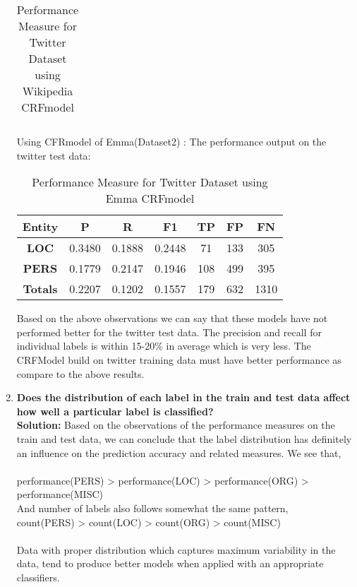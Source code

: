 \documentclass[12pt]{article}
\begin{document}
\begin{enumerate}
\begin{table}[ht!]
\begin{tabular}{ |c|c|c|c|c|c|c|}
\hline
\end{tabular}
\caption{Performance Measure for Twitter Dataset using Wikipedia CRFmodel}
\label{table:5}
\end{table}

Using CFRmodel of Emma(Dataset2) : The performance output on the twitter test data:\\
\begin{table}[ht!]
\centering
\begin{tabular}{ |c|c|c|c|c|c|c|} 
\hline 
\textbf{Entity} & \textbf{P} & \textbf{R} & \textbf{F1} &\textbf{TP} &\textbf{FP} & \textbf{FN} \\ [2ex]
\hline 
\textbf{LOC} & 0.3480  & 0.1888  & 0.2448 & 71 & 133 & 305\\ [1ex]
\hline 
\textbf{PERS} & 0.1779 & 0.2147 & 0.1946 & 108 & 499 & 395\\ [1ex]
\hline
\textbf{Totals}  & 0.2207 & 0.1202 & 0.1557 & 179 & 632 & 1310 \\  [1ex]

\hline
\end{tabular}
\caption{Performance Measure for Twitter Dataset using Emma CRFmodel}
\label{table:6}
\end{table}
\newpage
Based on the above observations we can say that these models have not performed better for the twitter test data. The precision and recall for individual labels is within 15-20\% in average which is very less. The CRFModel build on twitter training data must have better performance as compare to the above results.\\ 


\item \textbf{Does the distribution of each label in the train and test data affect how well a particular label is classified?}\\

\textbf{Solution:} Based on the observations of the performance measures on the train and test data, we can conclude that the label distribution has definitely an influence on the prediction accuracy and related measures.
We see that, \\
    \\performance(PERS) > performance(LOC) > performance(ORG) > performance(MISC)\\

And number of labels also follows somewhat the same pattern,
\\count(PERS) > count(LOC) > count(ORG) > count(MISC)  \\
\\Data with proper distribution which captures maximum variability in the data, tend to produce better models when applied with an appropriate classifiers.\\


\end{enumerate}
\end{document}
